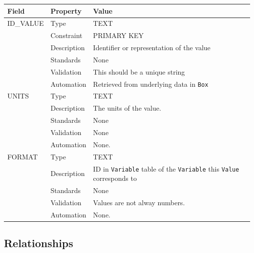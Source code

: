 \documentclass[
]{article}
\newcounter{none} %
\begin{document}
{\def\LTcaptype{none} %
\begin{longtable}[]{@{}
  >{\raggedright\arraybackslash}p{}
  >{\raggedright\arraybackslash}p{}
  >{\raggedright\arraybackslash}p{}@{}}
\toprule\noalign{}
\begin{minipage}[b]{\linewidth}\raggedright
Field
\end{minipage} & \begin{minipage}[b]{\linewidth}\raggedright
Property
\end{minipage} & \begin{minipage}[b]{\linewidth}\raggedright
Value
\end{minipage} \\
\midrule\noalign{}
\endhead
\bottomrule\noalign{}
\endlastfoot
ID\_VALUE & Type & TEXT \\
& Constraint & PRIMARY KEY \\
& Description & Identifier or representation of the value \\
& Standards & None \\
& Validation & This should be a unique string \\
& Automation & Retrieved from underlying data in \texttt{Box} \\
UNITS & Type & TEXT \\
& Description & The units of the value. \\
& Standards & None \\
& Validation & None \\
& Automation & None. \\
FORMAT & Type & TEXT \\
& Description & ID in \texttt{Variable} table of the \texttt{Variable}
this \texttt{Value} corresponds to \\
& Standards & None \\
& Validation & Values are not alway numbers. \\
& Automation & None. \\
\end{longtable}
}

\subsection{Relationships}\label{relationships-32}
\end{document}
